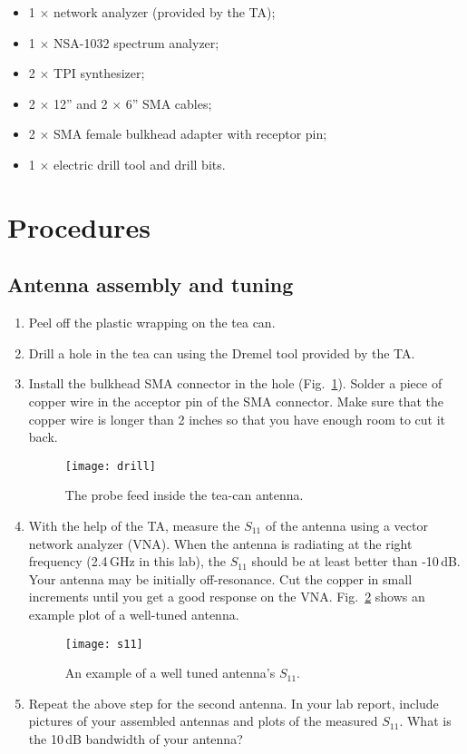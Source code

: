 \documentclass[letterpaper, 11pt]{article}
\begin{document}
\begin{itemize}[itemsep=0.5ex]
	\item 1 $\times$ network analyzer (provided by the TA);
	\item 1 $\times$ NSA-1032 spectrum analyzer;
	\item 2 $\times$ TPI synthesizer;
	\item 2 $\times$ 12'' and 2 $\times$ 6'' SMA cables;
	\item 2 $\times$ SMA female bulkhead adapter with receptor pin;
	\item 1 $\times$ electric drill tool and drill bits.
\end{itemize}


\section{Procedures}

\subsection{Antenna assembly and tuning}
\label{sec:antenna_assbly}

\begin{enumerate}
	\item Peel off the plastic wrapping on the tea can. 

	\item Drill a hole in the tea can using the Dremel tool provided by the TA. 
	\item Install the bulkhead SMA connector in the hole (Fig.~\ref{fig:drill}). Solder a piece of copper wire in the acceptor pin of the SMA connector. Make sure that the copper wire is longer than 2 inches so that you have enough room to cut it back.
	
		\begin{figure}[ht]
			\centering	
			\texttt{[image: drill]}
			\caption{The probe feed inside the tea-can antenna.}
			\label{fig:drill}
		\end{figure}
	 
	
	\item With the help of the TA, measure the $S_{11}$ of the antenna using a vector network analyzer (VNA). When the antenna is radiating at the right frequency (2.4\,GHz in this lab), the $S_{11}$ should be at least better than -10\,dB. Your antenna may be initially off-resonance. Cut the copper in small increments until you get a good response on the VNA. Fig.~\ref{fig:s11} shows an example plot of a well-tuned antenna. 
		\begin{figure}[ht]
			\centering	
			\texttt{[image: s11]}
			\caption{An example of a well tuned antenna's $S_{11}$.}
			\label{fig:s11}
		\end{figure}

	\item Repeat the above step for the second antenna. In your lab report, include pictures of your assembled antennas and plots of the measured $S_{11}$. What is the 10\,dB bandwidth of your antenna?  
		
\end{enumerate}
\end{document}
